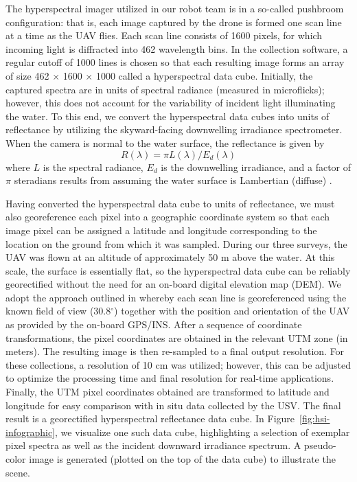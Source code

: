 \documentclass[remotesensing,article,accept,pdftex,moreauthors]{Definitions/mdpi}
\begin{document}
The hyperspectral imager utilized in our robot team is in a so-called pushbroom configuration: that is, each image captured by the drone is formed one scan line at a time as the UAV flies. Each scan line consists of 1600 pixels, for which incoming light is diffracted into 462 wavelength bins. In the collection software, a regular cutoff of 1000 lines is chosen so that each resulting image forms an array of size 462 $\times$ 1600 $\times$ 1000 called a hyperspectral data cube. Initially, the captured spectra are in units of spectral radiance (measured in microflicks); however, this does not account for the variability of incident light illuminating the water. To this end, we convert the hyperspectral data cubes into units of reflectance by utilizing the skyward-facing downwelling irradiance spectrometer. When the camera is normal to the water surface, the reflectance is given by
\begin{equation}
    R(\lambda) = \pi L(\lambda)/E_d(\lambda)
\end{equation}
where $L$ is the spectral radiance, $E_d$ is the downwelling irradiance, and a factor of $\pi$ steradians results from assuming the water surface is Lambertian (diffuse) \cite{reflectance-conversion}. 

Having converted the hyperspectral data cube to units of reflectance, we must also georeference each pixel into a geographic coordinate system so that each image pixel can be assigned a latitude and longitude corresponding to the location on the ground from which it was sampled. During our three surveys, the UAV was flown at an altitude of approximately %
50 m above the water. At this scale, the surface is essentially flat, so the hyperspectral data cube can be reliably georectified without the need for an on-board digital elevation map (DEM). We adopt the approach outlined in \cite{GeorectificationMuller, GeorectificationBaumker, GeorectificationMostafa} whereby each scan line is georeferenced using the known field of view (30.8$^\circ$) together with the position and orientation of the UAV as provided by the on-board GPS/INS. After a sequence of coordinate transformations, the pixel coordinates are obtained in the relevant UTM zone (in meters). The resulting image is then re-sampled to a final output resolution. For these collections, a resolution of 10 cm was utilized; however, this can be adjusted to optimize the processing time and final resolution for real-time applications. Finally, the UTM pixel coordinates obtained are transformed to latitude and longitude for easy comparison with in situ data collected by the USV. The final result is a georectified hyperspectral reflectance data cube. In Figure~\ref{fig:hsi-infographic}, we visualize one such data cube, highlighting a selection of exemplar pixel spectra as well as the incident downward irradiance spectrum. A pseudo-color image is generated (plotted on the top of the data cube) to illustrate the scene.
\end{document}
